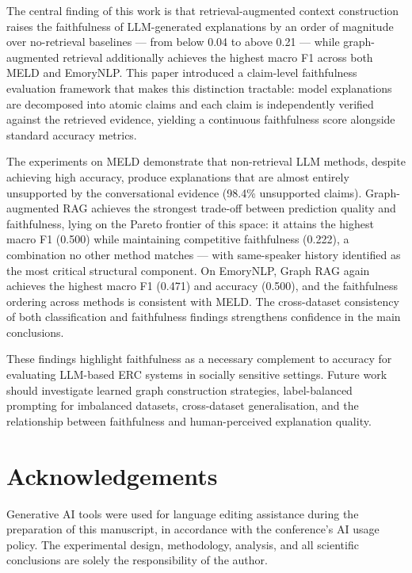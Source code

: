 \documentclass[runningheads]{llncs}
\begin{document}
The central finding of this work is that retrieval-augmented context
construction raises the faithfulness of LLM-generated explanations by
an order of magnitude over no-retrieval baselines — from below 0.04 to
above 0.21 — while graph-augmented retrieval additionally achieves the
highest macro F1 across both MELD and EmoryNLP. This paper introduced
a claim-level faithfulness evaluation framework that makes this
distinction tractable: model explanations are decomposed into atomic
claims and each claim is independently verified against the retrieved
evidence, yielding a continuous faithfulness score alongside standard
accuracy metrics.

The experiments on MELD demonstrate that non-retrieval LLM methods,
despite achieving high accuracy, produce explanations that are almost
entirely unsupported by the conversational evidence (98.4\% unsupported
claims). Graph-augmented RAG achieves the strongest trade-off between prediction
quality and faithfulness, lying on the Pareto frontier of this space:
it attains the highest macro F1 (0.500) while maintaining competitive
faithfulness (0.222), a combination no other method matches — with
same-speaker history identified as the most critical structural component. On EmoryNLP, Graph RAG again achieves the highest macro F1 (0.471) and
accuracy (0.500), and the faithfulness ordering across methods is
consistent with MELD. The cross-dataset consistency of both classification
and faithfulness findings strengthens confidence in the main conclusions.

These findings highlight faithfulness as a necessary complement to
accuracy for evaluating LLM-based ERC systems in socially sensitive
settings. Future work should investigate learned graph construction
strategies, label-balanced prompting for imbalanced datasets,
cross-dataset generalisation, and the relationship between faithfulness
and human-perceived explanation quality.

\section*{Acknowledgements}
Generative AI tools were used for language editing assistance during the
preparation of this manuscript, in accordance with the conference's AI
usage policy. The experimental design, methodology, analysis, and all
scientific conclusions are solely the responsibility of the author.



\end{document}
